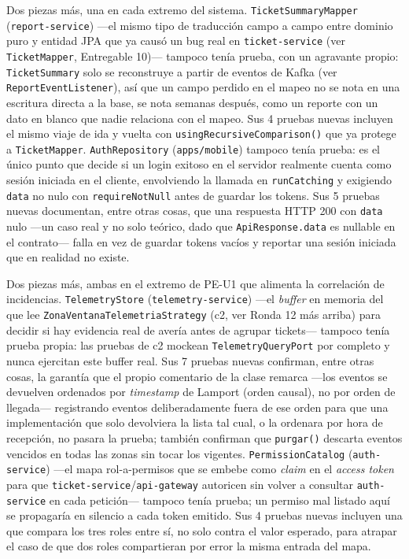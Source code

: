 Dos piezas más, una en cada extremo del sistema. \texttt{TicketSummaryMapper}
(\texttt{report-service}) —el mismo tipo de traducción campo a campo entre dominio puro y
entidad JPA que ya causó un bug real en \texttt{ticket-service} (ver \texttt{TicketMapper},
Entregable 10)— tampoco tenía prueba, con un agravante propio: \texttt{TicketSummary} solo se
reconstruye a partir de eventos de Kafka (ver \texttt{ReportEventListener}), así que un campo
perdido en el mapeo no se nota en una escritura directa a la base, se nota semanas después, como
un reporte con un dato en blanco que nadie relaciona con el mapeo. Sus 4 pruebas nuevas incluyen
el mismo viaje de ida y vuelta con \texttt{usingRecursiveComparison()} que ya protege a
\texttt{TicketMapper}. \texttt{AuthRepository} (\texttt{apps/mobile}) tampoco tenía prueba: es
el único punto que decide si un login exitoso en el servidor realmente cuenta como sesión
iniciada en el cliente, envolviendo la llamada en \texttt{runCatching} y exigiendo
\texttt{data} no nulo con \texttt{requireNotNull} antes de guardar los tokens. Sus 5 pruebas
nuevas documentan, entre otras cosas, que una respuesta HTTP 200 con \texttt{data} nulo —un
caso real y no solo teórico, dado que \texttt{ApiResponse.data} es nullable en el contrato—
falla en vez de guardar tokens vacíos y reportar una sesión iniciada que en realidad no existe.

Dos piezas más, ambas en el extremo de PE-U1 que alimenta la correlación de incidencias.
\texttt{TelemetryStore} (\texttt{telemetry-service}) —el \emph{buffer} en memoria del que lee
\texttt{ZonaVentanaTelemetriaStrategy} (c2, ver Ronda 12 más arriba) para decidir si hay
evidencia real de avería antes de agrupar tickets— tampoco tenía prueba propia: las pruebas de
c2 mockean \texttt{TelemetryQueryPort} por completo y nunca ejercitan este buffer real. Sus 7
pruebas nuevas confirman, entre otras cosas, la garantía que el propio comentario de la clase
remarca —los eventos se devuelven ordenados por \emph{timestamp} de Lamport (orden causal), no
por orden de llegada— registrando eventos deliberadamente fuera de ese orden para que una
implementación que solo devolviera la lista tal cual, o la ordenara por hora de recepción, no
pasara la prueba; también confirman que \texttt{purgar()} descarta eventos vencidos en todas las
zonas sin tocar los vigentes. \texttt{PermissionCatalog} (\texttt{auth-service}) —el mapa
rol-a-permisos que se embebe como \emph{claim} en el \emph{access token} para que
\texttt{ticket-service}/\texttt{api-gateway} autoricen sin volver a consultar
\texttt{auth-service} en cada petición— tampoco tenía prueba; un permiso mal listado aquí se
propagaría en silencio a cada token emitido. Sus 4 pruebas nuevas incluyen una que compara los
tres roles entre sí, no solo contra el valor esperado, para atrapar el caso de que dos roles
compartieran por error la misma entrada del mapa.

